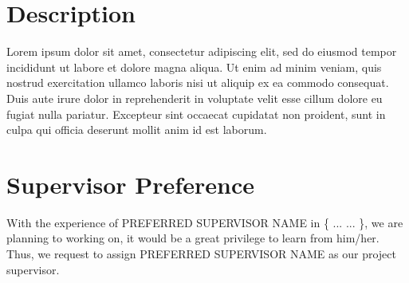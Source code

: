 \documentclass[a4paper, 12pt]{report}
\begin{document}
	
	\section*{Description}
	Lorem ipsum dolor sit amet, consectetur adipiscing elit, sed do eiusmod tempor incididunt ut labore et dolore magna aliqua. Ut enim ad minim veniam, quis nostrud exercitation ullamco laboris nisi ut aliquip ex ea commodo consequat. Duis aute irure dolor in reprehenderit in voluptate velit esse cillum dolore eu fugiat nulla pariatur. Excepteur sint occaecat cupidatat non proident, sunt in culpa qui officia deserunt mollit anim id est laborum.
	\vspace{0.5cm}
	
	
	\section*{Supervisor Preference}
	With the experience of PREFERRED SUPERVISOR NAME in \{ ... ... \}, we are planning to working on, it would be a great privilege to learn from him/her. Thus, we request to assign PREFERRED SUPERVISOR NAME as our project supervisor.
	\vspace{4cm}	
	
	\DTMToday
\end{document}
